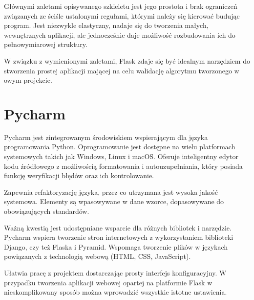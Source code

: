 Głównymi zaletami opisywanego szkieletu jest jego prostota i brak ograniczeń związanych ze ściśle ustalonymi regułami, którymi należy się kierować budując program. Jest niezwykle elastyczny, nadaje się do tworzenia małych, wewnętrznych aplikacji, ale jednocześnie daje możliwość rozbudowania ich do pełnowymiarowej struktury. 

W związku z wymienionymi zaletami, Flask zdaje się być idealnym narzędziem do stworzenia prostej aplikacji mającej na celu walidację algorytmu tworzonego w owym projekcie.

\section{Pycharm}
Pycharm \cite{pycharm} jest zintegrowanym środowiskiem wspierającym dla języka programowania Python. Oprogramowanie jest dostępne na wielu platformach systemowych takich jak Windows, Linux i macOS. Oferuje inteligentny edytor kodu źródłowego z możliwością formatowania i autouzupełniania, który posiada funkcję weryfikacji błędów oraz ich kontrolowanie.

Zapewnia refaktoryzację języka, przez co utrzymana jest wysoka jakość systemowa. Elementy są wpasowywane w dane wzorce, dopasowywane do obowiązujących standardów.

Ważną kwestią jest udostępniane wsparcie dla różnych bibliotek i narzędzie. Pycharm wspiera tworzenie stron internetowych z wykorzystaniem biblioteki Django, czy też Flaska i Pyramid. Wspomaga tworzenie plików w językach powiązanych z technologią webową (HTML, CSS, JavaScript).

Ułatwia pracę z projektem dostarczając prosty interfejs konfiguracyjny. W przypadku tworzenia aplikacji webowej opartej na platformie Flask w nieskomplikowany sposób można wprowadzić wszystkie istotne ustawienia.






